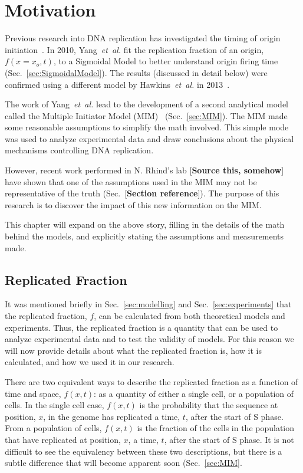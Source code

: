 \chapter{Motivation}
\label{ch:Motivation}

Previous research into DNA replication has investigated the timing of origin initiation~\cite{ScottsPaper,Bechhoefer2012374,deMouraModel1,deMouraModel2,StochasticTermination}.
In 2010, Yang~\emph{et~al.} fit the replication fraction of an origin, $f(x=x_o,t)$, to a Sigmoidal Model to better understand origin firing time~\cite{ScottsPaper} (Sec.~\ref{sec:SigmoidalModel}).
The results (discussed in detail below) were confirmed using a different model by Hawkins~\emph{et~al.} in 2013~\cite{StochasticTermination}.

The work of Yang~\emph{et~al.} lead to the development of a second analytical model called the Multiple Initiator Model (MIM)~\cite{ScottsPaper} (Sec.~\ref{sec:MIM}).
The MIM made some reasonable assumptions to simplify the math involved.
This simple mode was used to analyze experimental data and draw conclusions about the physical mechanisms controlling DNA replication.

However, recent work performed in N. Rhind's lab [\textbf{Source this, somehow}] have shown that one of the assumptions used in the MIM may not be representative of the truth (Sec.~[\textbf{Section reference}]).
The purpose of this research is to discover the impact of this new information on the MIM.

This chapter will expand on the above story, filling in the details of the math behind the models, and explicitly stating the assumptions and measurements made.


	\section{Replicated Fraction}
	\label{sec:ReplicatedFraction}
	
	It was mentioned briefly in Sec.~\ref{sec:modelling} and Sec.~\ref{sec:experiments} that the replicated fraction, $f$, can be calculated from both theoretical models and experiments.
	Thus, the replicated fraction is a quantity that can be used to analyze experimental data and to test the validity of models.
	For this reason we will now provide details about what the replicated fraction is, how it is calculated, and how we used it in our research.
	
	There are two equivalent ways to describe the replicated fraction as a function of time and space, $f(x,t)$:
	as a quantity of either a single cell, or a population of cells.
	In the single cell case, $f(x,t)$ is the probability that the sequence at position, $x$, in the genome has replicated a time, $t$, after the start of S phase.
	From a population of cells, $f(x,t)$ is the fraction of the cells in the population that have replicated at position, $x$, a time, $t$, after the start of S phase.
	It is not difficult to see the equivalency between these two descriptions, but there is a subtle difference that will become apparent soon (Sec.~\ref{sec:MIM}.
	
